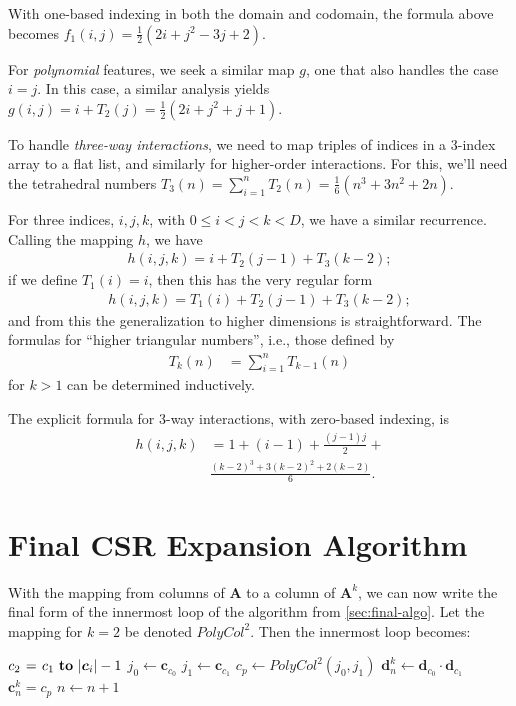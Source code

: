 \documentclass{article} %
\begin{document}
With one-based indexing in both the domain and codomain, the formula above becomes
$f_1(i, j)  = \frac{1}{2}(2i + j^2 - 3j + 2).$

For \emph{polynomial} features, we seek a similar map $g$, one that also handles the case $i = j$. In this case, a similar analysis yields
$ g(i, j) = i + T_2(j) = \frac{1}{2} (2i + j^2 + j + 1).$


To handle \emph{three-way interactions}, we need to map triples of indices in a 3-index array to a flat list, and similarly for higher-order interactions. For this, we'll need the tetrahedral numbers $T_3(n) = \sum_{i=1}^n T_{2}(n) = 
\frac{1}{6}(n^3 + 3n^2 + 2n)$.

For three indices, $i,j,k$, with $0 \le i < j < k < D$, we have a similar recurrence. Calling the mapping $h$, we have 
\begin{align}
h(i,j,k) = i + T_2(j-1) + T_3(k-2);
\end{align}
if we define $T_1(i) = i$, then this has the very regular form
\begin{align}
h(i,j,k) =  T_1(i) + T_2(j-1) + T_3(k-2);
\end{align}
and from this the generalization to higher dimensions is straightforward. The formulas for ``higher triangular numbers'', i.e., those defined by
\begin{align}
T_k(n) &= \sum_{i=1}^n T_{k-1}(n)
\end{align}
for $k > 1$ can be determined inductively.

The explicit formula for 3-way interactions, with zero-based indexing, is 
\begin{align}
h(i, j, k) &= 1 + (i-1) + \frac{(j-1)j}{2} + \\
& \frac{(k-2)^3 + 3(k-2)^2 + 2(k-2)}{6}. 
\end{align}

\section{Final CSR Expansion Algorithm}
With the mapping from columns of $\bm{A}$ to a column of $\bm{A}^k$, we can now write the final form of the innermost loop of the algorithm from \ref{sec:final-algo}.
Let the mapping for $k=2$ be denoted $PolyCol^2$.
Then the innermost loop becomes:

\begin{codebox}
\footnotesize
    \zi         \For $c_2 \gets c_1 \To |\bm{c}_i|-1$ \Do
    \zi             $j_0 \gets \bm{c}_{c_0}$
    \zi             $j_1 \gets \bm{c}_{c_1}$
    \zi             $c_p \gets PolyCol^2(j_0, j_1)$
    \zi             $\bm{d}^k_{n} \gets \bm{d}_{c_0} \cdot \bm{d}_{c_1}$
    \zi             $\bm{c}^k_{n} = c_p$
    \zi             $n \gets n + 1$
                \End
\end{codebox}
\end{document}
